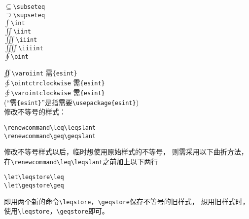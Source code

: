 \documentclass{article}
\newcommand{\q}{\quad}
\begin{document}
\begin{multicols}{2}
\begin{enumerate}
\begin{multicols}{2}
                  $ \subseteq $\q \verb|\subseteq| \\
                  $ \supseteq $\q \verb|\supseteq| \\
                  $ \int $\q \verb|\int| \\
                  $ \iint $\q \verb|\iint| \\
                  $ \iiint $\q \verb|\iiint| \\
                  $ \iiiint $\q \verb|\iiiint| \\
                  $ \oint $\q \verb|\oint|
              \end{multicols}
              \vspace{-5mm}
              $ \varoiint $\q \verb|\varoiint| 需\verb|{esint}| \\
              $ \ointctrclockwise $\q \verb|\ointctrclockwise| 需\verb|{esint}| \\
              $ \varointclockwise $\q \verb|\varointclockwise| 需\verb|{esint}| \\
              (“需\verb|{esint}|”是指需要\verb|\usepackage{esint}|) \\
              修改不等号的样式：
              \begin{lstlisting}
\renewcommand\leq\leqslant
\renewcommand\geq\geqslant    
\end{lstlisting}
              修改不等号样式以后，临时想使用原始样式的不等号，
              则需采用以下曲折方法，\\
              在\verb|\renewcommand\leq\leqslant|之前加上以下两行
              \begin{lstlisting}
\let\leqstore\leq
\let\geqstore\geq    
\end{lstlisting}
              即用两个新的命令\verb|\leqstore|，\verb|\geqstore|保存不等号的旧样式，
              想用旧样式时，使用\verb|\leqstore|，\verb|\geqstore|即可。


\end{enumerate}
\end{multicols}
\end{document}
